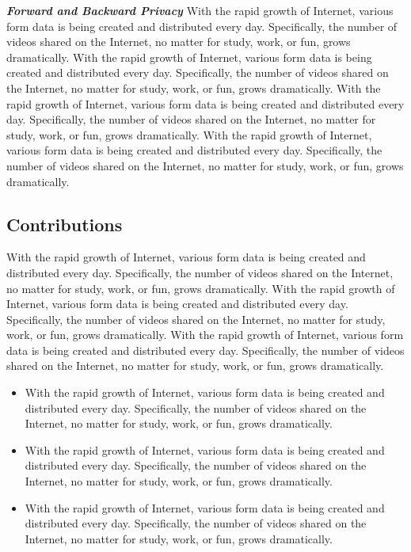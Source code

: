 \documentclass[a4paper,12pt,UTF8]{ctexart}
\begin{document}
\begin{spacing}{1.1}
\newline\indent\emph{\textbf{Forward and Backward Privacy}} With the rapid growth of Internet, various form data is being created and distributed every day. Specifically, the number of videos shared on the Internet, no matter for study, work, or fun, grows dramatically. With the rapid growth of Internet, various form data is being created and distributed every day. Specifically, the number of videos shared on the Internet, no matter for study, work, or fun, grows dramatically. With the rapid growth of Internet, various form data is being created and distributed every day. Specifically, the number of videos shared on the Internet, no matter for study, work, or fun, grows dramatically. With the rapid growth of Internet, various form data is being created and distributed every day. Specifically, the number of videos shared on the Internet, no matter for study, work, or fun, grows dramatically. 
\subsection{Contributions}
With the rapid growth of Internet, various form data is being created and distributed every day. Specifically, the number of videos shared on the Internet, no matter for study, work, or fun, grows dramatically. With the rapid growth of Internet, various form data is being created and distributed every day. Specifically, the number of videos shared on the Internet, no matter for study, work, or fun, grows dramatically. With the rapid growth of Internet, various form data is being created and distributed every day. Specifically, the number of videos shared on the Internet, no matter for study, work, or fun, grows dramatically. 
\begin{itemize}
	\setlength{\itemsep}{1.50mm} %
	\setlength{\parskip}{0mm} %
	\setlength{\parsep}{0pt} %
	\item With the rapid growth of Internet, various form data is being created and distributed every day. Specifically, the number of videos shared on the Internet, no matter for study, work, or fun, grows dramatically. 
	\item With the rapid growth of Internet, various form data is being created and distributed every day. Specifically, the number of videos shared on the Internet, no matter for study, work, or fun, grows dramatically. 
	\item With the rapid growth of Internet, various form data is being created and distributed every day. Specifically, the number of videos shared on the Internet, no matter for study, work, or fun, grows dramatically. 
\end{itemize}

\end{spacing}
\end{document}
